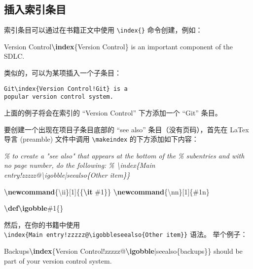 \documentclass[
  12pt,
]{krantz}
\newenvironment{Shaded}{\begin{snugshade}}{\end{snugshade}}
\newcommand{\CommentTok}[1]{\textcolor[rgb]{0.56,0.35,0.01}{\textit{#1}}}
\newcommand{\ExtensionTok}[1]{#1}
\newcommand{\FunctionTok}[1]{\textcolor[rgb]{0.13,0.29,0.53}{\textbf{#1}}}
\newcommand{\NormalTok}[1]{#1}
\theoremstyle{definition}
\theoremstyle{definition}
\theoremstyle{definition}
\theoremstyle{definition}
\theoremstyle{remark}
\begin{document}
\subsection{插入索引条目}\label{ux63d2ux5165ux7d22ux5f15ux6761ux76ee}

索引条目可以通过在书籍正文中使用 \texttt{\textbackslash{}index\{\}} 命令创建，例如：

\begin{Shaded}
\begin{Highlighting}[]
\NormalTok{Version Control}\FunctionTok{\textbackslash{}index}\NormalTok{\{Version Control\} is an}
\NormalTok{important component of the SDLC.}
\end{Highlighting}
\end{Shaded}

类似的，可以为某项插入一个子条目：

\begin{verbatim}
Git\index{Version Control!Git} is a
popular version control system.
\end{verbatim}

上面的例子将会在索引的 ``Version Control'' 下方添加一个 ``Git'' 条目。

要创建一个出现在项目子条目底部的 ``see also'' 条目（没有页码），首先在 LaTex 导言 (preamble) 文件中调用 \texttt{\textbackslash{}makeindex} 的下方添加如下内容：

\begin{Shaded}
\begin{Highlighting}[]
\CommentTok{\% to create a "see also" that appears at the bottom of the}
\CommentTok{\% subentries and with no page number, do the following:}
\CommentTok{\% \textbackslash{}index\{Main entry!zzzzz@\textbackslash{}igobble|seealso\{Other item\}\}}

\FunctionTok{\textbackslash{}newcommand}\NormalTok{\{}\ExtensionTok{\textbackslash{}ii}\NormalTok{\}[1]\{\{}\FunctionTok{\textbackslash{}it}\NormalTok{ \#1\}\}}
\FunctionTok{\textbackslash{}newcommand}\NormalTok{\{}\ExtensionTok{\textbackslash{}nn}\NormalTok{\}[1]\{\#1n\}}

\FunctionTok{\textbackslash{}def\textbackslash{}igobble}\NormalTok{\#1\{\}}
\end{Highlighting}
\end{Shaded}

然后，在你的书籍中使用 \texttt{\textbackslash{}index\{Main\ entry!zzzzz@\textbackslash{}igobble\textbar{}seealso\{Other\ item\}\}} 语法。 举个例子：

\begin{Shaded}
\begin{Highlighting}[]
\NormalTok{Backups}\FunctionTok{\textbackslash{}index}\NormalTok{\{Version Control!zzzzz@}\FunctionTok{\textbackslash{}igobble}\NormalTok{|seealso\{backups\}\}}
\NormalTok{should be part of your version control system.}
\end{Highlighting}
\end{Shaded}
\end{document}
